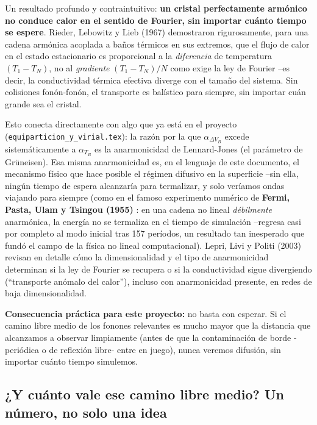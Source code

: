 \documentclass[11pt,a4paper]{article}
\begin{document}
Un resultado profundo y contraintuitivo: \textbf{un cristal perfectamente
armónico no conduce calor en el sentido de Fourier, sin importar cuánto
tiempo se espere}. Rieder, Lebowitz y Lieb (1967) \cite{RLL1967}
demostraron rigurosamente, para una cadena armónica acoplada a baños
térmicos en sus extremos, que el flujo de calor en el estado estacionario es
proporcional a la \emph{diferencia} de temperatura $(T_1-T_N)$, no al
\emph{gradiente} $(T_1-T_N)/N$ como exige la ley de Fourier --es decir, la
conductividad térmica efectiva diverge con el tamaño del sistema. Sin
colisiones fonón-fonón, el transporte es balístico para siempre,
sin importar cuán grande sea el cristal.

Esto conecta directamente con algo que ya está en el proyecto
(\texttt{equiparticion\_y\_virial.tex}): la razón por la que
$\alpha_{\Delta V_B}$ excede sistemáticamente a $\alpha_{T_B}$ es la
anarmonicidad de Lennard-Jones (el parámetro de Grüneisen). Esa misma
anarmonicidad es, en el lenguaje de este documento, el mecanismo físico que
hace posible el régimen difusivo en la superficie --sin ella, ningún tiempo
de espera alcanzaría para termalizar, y solo veríamos ondas viajando para
siempre (como en el famoso experimento numérico de
\textbf{Fermi, Pasta, Ulam y Tsingou (1955)} \cite{FPU1955}: en una cadena
no lineal \emph{débilmente} anarmónica, la energía no se termaliza en el
tiempo de simulación --regresa casi por completo al modo inicial tras 157
períodos, un resultado tan inesperado que fundó el campo de la física no
lineal computacional). Lepri, Livi y Politi (2003) \cite{LLP2003} revisan en
detalle cómo la dimensionalidad y el tipo de anarmonicidad determinan si la
ley de Fourier se recupera o si la conductividad sigue divergiendo
(``transporte anómalo del calor''), incluso con anarmonicidad presente,
en redes de baja dimensionalidad.

\textbf{Consecuencia práctica para este proyecto:} no basta con esperar. Si
el camino libre medio de los fonones relevantes es mucho mayor que la
distancia que alcanzamos a observar limpiamente (antes de que la
contaminación de borde -periódica o de reflexión libre- entre en juego),
nunca veremos difusión, sin importar cuánto tiempo simulemos.

\subsection{¿Y cuánto vale ese camino libre medio? Un número, no solo una idea}
\label{sec:kn_numerico}
\end{document}
